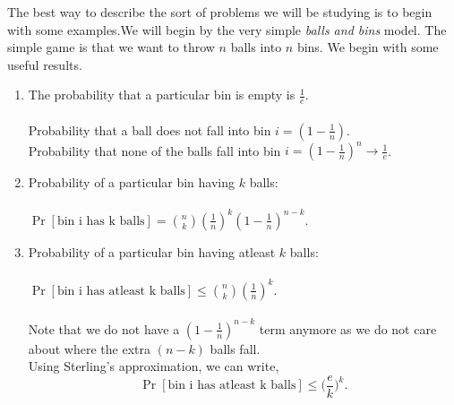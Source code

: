 \documentclass[a4paper,english,11pt]{article}
\begin{document}
\par The best way to describe the sort of problems we will be studying is to begin
with some examples.We will begin by the very simple \emph{balls and bins} model. The simple game is that we want to throw $n$ balls into $n$ bins.  We begin with some useful results.
\begin{enumerate}
\item The probability that a particular bin is empty is $\frac{1}{e}$.\\\\
Probability that a ball does not fall into bin $i = (1-\frac{1}{n})$.\\
Probability that none of the balls fall into bin $i = (1-\frac{1}{n})^n \rightarrow \frac{1}{e}$.
\item  Probability of a particular bin having $k$ balls:\\\\
$\Pr[\text{bin i has k balls}] = {n \choose k}(\frac{1}{n})^k (1-\frac{1}{n})^{n-k}$.

\item Probability of a particular bin having atleast  $k$ balls:\\\\
$\Pr[\text{bin i has atleast k balls}] \leq {n \choose k}(\frac{1}{n})^k$.\\\\
Note that we do not have a $(1-\frac{1}{n})^{n-k}$ term anymore as we do not care about where the extra $(n-k)$ balls fall.\\
Using Sterling's approximation, we can write,
\[\Pr[\text{bin i has atleast k balls}] \leq \Big(\frac{e}{k}\Big)^k.\]

\end{enumerate}
\end{document}
